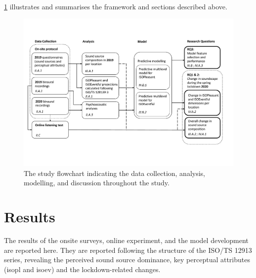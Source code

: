   \cref{fig:lockdown-study-framework} illustrates and summarises the framework and sections described above.

   \begin{figure}[h]
     \centering
     \includegraphics[width=\textwidth]{Figures/Lockdown-Fig1.pdf}
     \caption{The study flowchart indicating the data collection, analysis, modelling, and discussion throughout the study.  \label{fig:lockdown-study-framework}}
   \end{figure}

\section{Results}

 The results of the onsite surveys, online experiment, and the model development are reported here. They are reported following the structure of the ISO/TS 12913 series, revealing the perceived sound source dominance, key perceptual attributes (\gls{isopl} and \gls{isoev}) and the lockdown-related changes.

